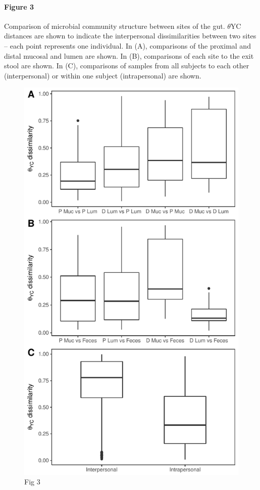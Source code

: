 \documentclass[12pt,]{article}
\let\oldparagraph\paragraph
\renewcommand{\paragraph}[1]{\oldparagraph{#1}\mbox{}}
\begin{document}
\newpage

\paragraph{Figure 3}\label{figure-3}

Comparison of microbial community structure between sites of the gut.
\(\theta\)YC distances are shown to indicate the interpersonal
dissimilarities between two sites -- each point represents one
individual. In (A), comparisons of the proximal and distal mucosal and
lumen are shown. In (B), comparisons of each site to the exit stool are
shown. In (C), comparisons of samples from all subjects to each other
(interpersonal) or within one subject (intrapersonal) are shown.

\begin{figure}[htbp]
\centering
\includegraphics{../submission/figure_3.pdf}
\caption{Fig 3}
\end{figure}
\end{document}
